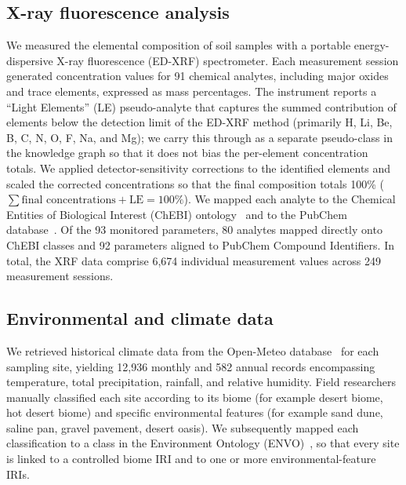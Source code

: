 \documentclass[11pt,a4paper]{article}
\begin{document}
\subsection{X-ray fluorescence analysis}

We measured the elemental composition of soil samples with a portable
energy-dispersive X-ray fluorescence (ED-XRF) spectrometer. Each
measurement session generated concentration values for 91 chemical
analytes, including major oxides and trace elements, expressed as mass
percentages. The instrument reports a ``Light Elements'' (LE)
pseudo-analyte that captures the summed contribution of elements below
the detection limit of the ED-XRF method (primarily H, Li, Be, B, C,
N, O, F, Na, and Mg); we carry this through as a separate pseudo-class
in the knowledge graph so that it does not bias the per-element
concentration totals. We applied detector-sensitivity corrections to
the identified elements and scaled the corrected concentrations so
that the final composition totals 100\% (\(\sum\text{final
concentrations} + \text{LE} = 100\%\)). We mapped each analyte to the
Chemical Entities of Biological Interest (ChEBI)
ontology~\cite{chebi} and to the PubChem
database~\cite{pubchem}. Of the 93 monitored parameters, 80 analytes
mapped directly onto ChEBI classes and 92 parameters aligned to
PubChem Compound Identifiers. In total, the XRF data comprise 6{,}674
individual measurement values across 249 measurement sessions.

\subsection{Environmental and climate data}

We retrieved historical climate data from the Open-Meteo
database~\cite{openmeteo} for each sampling site, yielding 12{,}936
monthly and 582 annual records encompassing temperature, total
precipitation, rainfall, and relative humidity. Field researchers
manually classified each site according to its biome (for example
desert biome, hot desert biome) and specific environmental features
(for example sand dune, saline pan, gravel pavement, desert oasis). We
subsequently mapped each classification to a class in the Environment
Ontology (ENVO)~\cite{envo}, so that every site is linked to a
controlled biome IRI and to one or more environmental-feature IRIs.
\end{document}
